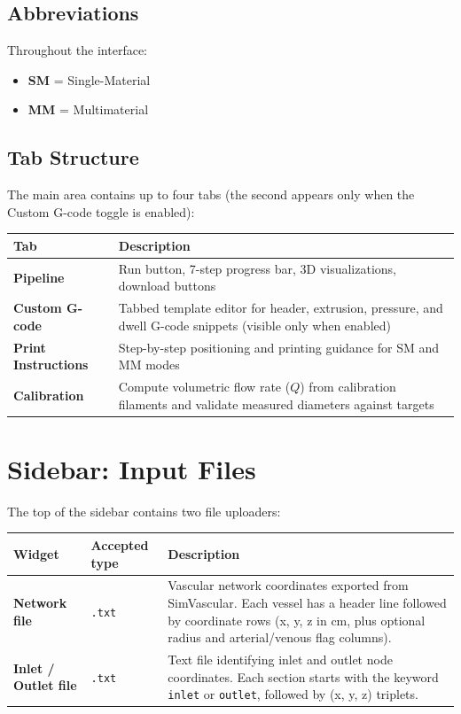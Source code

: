\documentclass[11pt,letterpaper]{article}
\newcommand{\code}[1]{\texttt{#1}}
\newcommand{\gui}[1]{\textcolor{guicolor}{\textsf{\textbf{#1}}}}
\begin{document}
\subsection{Abbreviations}

Throughout the interface:
\begin{itemize}[nosep]
    \item \textbf{SM} = Single-Material
    \item \textbf{MM} = Multimaterial
\end{itemize}

\subsection{Tab Structure}

The main area contains up to four tabs (the second appears only when
the Custom G-code toggle is enabled):

\begin{tabularx}{\textwidth}{l X}
\toprule
\textbf{Tab} & \textbf{Description} \\
\midrule
\gui{Pipeline}               & Run button, 7-step progress bar, 3D visualizations, download buttons \\
\gui{Custom G-code}          & Tabbed template editor for header, extrusion, pressure, and dwell G-code snippets (visible only when enabled) \\
\gui{Print Instructions}     & Step-by-step positioning and printing guidance for SM and MM modes \\
\gui{Calibration}            & Compute volumetric flow rate ($Q$) from calibration filaments and validate measured diameters against targets \\
\bottomrule
\end{tabularx}

\section{Sidebar: Input Files}
\label{sec:input-files}

The top of the sidebar contains two file uploaders:

\begin{tabularx}{\textwidth}{l l X}
\toprule
\textbf{Widget} & \textbf{Accepted type} & \textbf{Description} \\
\midrule
\gui{Network file} & \code{.txt} & Vascular network coordinates exported from SimVascular. Each vessel has a header line followed by coordinate rows (x, y, z in cm, plus optional radius and arterial/venous flag columns). \\
\gui{Inlet / Outlet file} & \code{.txt} & Text file identifying inlet and outlet node coordinates. Each section starts with the keyword \code{inlet} or \code{outlet}, followed by (x, y, z) triplets. \\
\bottomrule
\end{tabularx}
\end{document}
